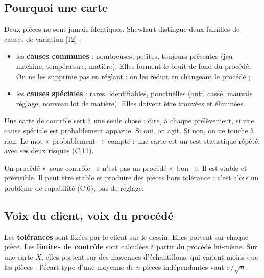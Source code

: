 \documentclass[11pt,a4paper]{article}
\providecommand{\og}{«~}\providecommand{\fg}{~»}
\begin{document}
\subsection{Pourquoi une carte}
Deux pièces ne sont jamais identiques. Shewhart distingue deux familles de causes de variation [12] :
\begin{itemize}[nosep]
\item les \textbf{causes communes} : nombreuses, petites, toujours présentes (jeu machine, température, matière). Elles forment le bruit de fond du procédé. On ne les supprime pas en réglant : on les réduit en changeant le procédé ;
\item les \textbf{causes spéciales} : rares, identifiables, ponctuelles (outil cassé, mauvais réglage, nouveau lot de matière). Elles doivent être trouvées et éliminées.
\end{itemize}
Une carte de contrôle sert à une seule chose : dire, à chaque prélèvement, si une cause spéciale est probablement apparue. Si oui, on agit. Si non, on ne touche à rien. Le mot \og probablement \fg{} compte : une carte est un test statistique répété, avec ses deux risques (C.11).

\begin{retenir}
Un procédé \og sous contrôle \fg{} n'est pas un procédé \og bon \fg. Il est stable et prévisible. Il peut être stable et produire des pièces hors tolérance : c'est alors un problème de capabilité (C.6), pas de réglage.
\end{retenir}

\subsection{Voix du client, voix du procédé}
Les \textbf{tolérances} sont fixées par le client sur le dessin. Elles portent sur chaque pièce. Les \textbf{limites de contrôle} sont calculées à partir du procédé lui-même. Sur une carte $\bar X$, elles portent sur des moyennes d'échantillons, qui varient moins que les pièces : l'écart-type d'une moyenne de $n$ pièces indépendantes vaut $\sigma/\sqrt n$.
\end{document}

